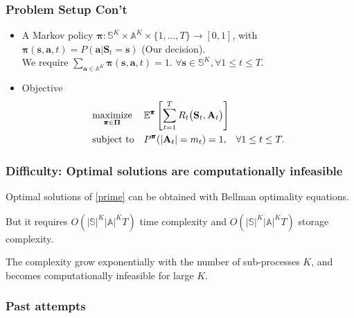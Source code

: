 \documentclass{beamer}
\newcommand{\av}{\mathbf{a}}
\newcommand{\allp}{\pmb{\pi}}
\newcommand{\allpset}{\mathbf{\Pi}}
\newcommand{\allstates}{\mathbb{S}^K}
\newcommand{\allstate}{\mathbf{s}}
\newcommand{\allstater}{\mathbf{S}}
\newcommand{\allactions}{\mathbb{A}^K}
\newcommand{\allaction}{\av}
\newcommand{\allar}{\mathbf{A}}
\newcommand{\allr}{R}
\newcommand{\substates}{\mathbb{S}}
\newcommand{\subactions}{\mathbb{A}}
\begin{document}
\begin{frame}
\frametitle{Problem Setup Con't}
\begin{itemize}
\item A Markov policy $\allp:\allstates\times \allactions \times \{1,...,T\} \rightarrow [0,1]$, with $\allp(\allstate,\allaction,t) = P(\allaction|\allstater_t=\allstate)$ (Our decision).\\ We require $\sum_{\allaction\in\allactions}\allp(\allstate,\allaction,t)=1$.
$\forall \allstate\in\allstates, \forall 1\leq t\leq T$.
\item Objective
\begin{equation}\label{prime}
\begin{aligned}
& \underset{\allp\in\allpset}{\text{maximize}}
& & \mathbb{E}^{\allp}\left[\sum_{t=1}^{T}\allr_t\big(\allstater_t,\allar_t\big)\right] \\
& \text{subject to}
& & P^{\allp}(|\allar_t|=m_t)=1, \hspace{3mm}\forall 1\leq t\leq T .
\end{aligned}
\end{equation}
\end{itemize}
\end{frame}

\begin{frame}
\frametitle{Difficulty: Optimal solutions are computationally infeasible}
Optimal solutions of \eqref{prime} can be obtained with Bellman optimality equations.

\vspace{0.5cm}
But it requires $O(|\substates|^K|\subactions|^KT)$ time complexity and $O(|\substates|^K|\subactions|^KT)$ storage complexity.

\vspace{0.5cm}
The complexity grow exponentially with the number of sub-processes $K$, and becomes computationally infeasible for large $K$.
\end{frame}

\begin{frame}
\frametitle{Past attempts}
\end{frame}
\end{document}
